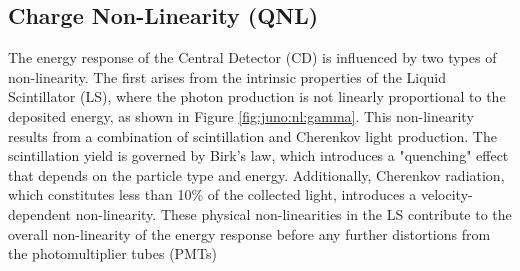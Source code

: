 \documentclass[../main.tex]{subfiles}
\begin{document}
%
%
%
%
%
%

\subsection{Charge Non-Linearity (QNL)}
\label{sec:joint_fit:qnl}

The energy response of the Central Detector (CD) is influenced by two types of non-linearity. The first arises from the intrinsic properties of the Liquid Scintillator (LS), where the photon production is not linearly proportional to the deposited energy, as shown in Figure \ref{fig:juno:nl:gamma}. This non-linearity results from a combination of scintillation and Cherenkov light production. The scintillation yield is governed by Birk’s law, which introduces a "quenching" effect that depends on the particle type and energy. Additionally, Cherenkov radiation, which constitutes less than 10\% of the collected light, introduces a velocity-dependent non-linearity. These physical non-linearities in the LS contribute to the overall non-linearity of the energy response before any further distortions from the photomultiplier tubes (PMTs)
\end{document}
